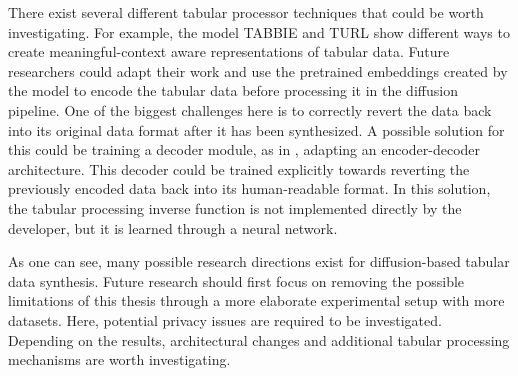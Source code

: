 There exist several different tabular processor techniques that could be worth investigating.
For example, the model TABBIE \cite{iida2021TABBIEPretrainedRepresentations} and TURL \cite{deng2021TURLTableUnderstanding} show different ways to create
meaningful-context aware representations of tabular data.
Future researchers could adapt their work and use the pretrained embeddings created by the model to encode the tabular data before processing it in the diffusion pipeline.
One of the biggest challenges here is to correctly revert the data back into its original data format after it has been synthesized.
A possible solution for this could be training a decoder module, as in \cite{rombach2022HighResolutionImageSynthesis}, adapting an encoder-decoder architecture.
This decoder could be trained explicitly towards reverting the previously encoded data back into its human-readable format.
In this solution, the tabular processing inverse function is not implemented directly by the developer, but it is learned through a neural network.

As one can see, many possible research directions exist for diffusion-based tabular data synthesis.
Future research should first focus on removing the possible limitations of this thesis through a more elaborate experimental setup with more datasets.
Here, potential privacy issues are required to be investigated.
Depending on the results, architectural changes and additional tabular processing mechanisms are worth investigating.
